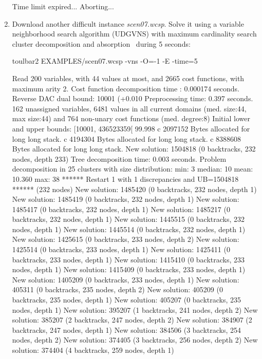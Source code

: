\begin{enumerate}
{\begin{DoxyCode}
Time limit expired... Aborting...
\end{DoxyCode}}
\item Download another difficult instance {\em scen07.wcsp}. Solve it using a variable neighborhood search algorithm (UDGVNS) with maximum cardinality search cluster decomposition and absorption~\cite{Ouali17} during 5 seconds:
\begin{DoxyCode}
	toulbar2 EXAMPLES/scen07.wcsp -vns -O=-1 -E -time=5
\end{DoxyCode}
{\scriptsize
\begin{DoxyCode}
Read 200 variables, with 44 values at most, and 2665 cost functions, with maximum arity 2.
Cost function decomposition time : 0.000174 seconds.
Reverse DAC dual bound: 10001 (+0.010%
Preprocessing time: 0.397 seconds.
162 unassigned variables, 6481 values in all current domains (med. size:44, max size:44) and 764 non-unary cost functions (med. degree:8)
Initial lower and upper bounds: [10001, 436523359[ 99.998%
c 2097152 Bytes allocated for long long stack.
c 4194304 Bytes allocated for long long stack.
c 8388608 Bytes allocated for long long stack.
New solution: 1504818 (0 backtracks, 232 nodes, depth 233)
Tree decomposition time: 0.003 seconds.
Problem decomposition in 25 clusters with size distribution: min: 3 median: 10 mean: 10.360 max: 38
****** Restart 1 with 1 discrepancies and UB=1504818 ****** (232 nodes)
New solution: 1485420 (0 backtracks, 232 nodes, depth 1)
New solution: 1485419 (0 backtracks, 232 nodes, depth 1)
New solution: 1485417 (0 backtracks, 232 nodes, depth 1)
New solution: 1485217 (0 backtracks, 232 nodes, depth 1)
New solution: 1445515 (0 backtracks, 232 nodes, depth 1)
New solution: 1445514 (0 backtracks, 232 nodes, depth 1)
New solution: 1425615 (0 backtracks, 233 nodes, depth 2)
New solution: 1425514 (0 backtracks, 233 nodes, depth 1)
New solution: 1425411 (0 backtracks, 233 nodes, depth 1)
New solution: 1415410 (0 backtracks, 233 nodes, depth 1)
New solution: 1415409 (0 backtracks, 233 nodes, depth 1)
New solution: 1405209 (0 backtracks, 233 nodes, depth 1)
New solution: 405311 (0 backtracks, 235 nodes, depth 2)
New solution: 405209 (0 backtracks, 235 nodes, depth 1)
New solution: 405207 (0 backtracks, 235 nodes, depth 1)
New solution: 395207 (1 backtracks, 241 nodes, depth 2)
New solution: 385207 (2 backtracks, 247 nodes, depth 2)
New solution: 384907 (2 backtracks, 247 nodes, depth 1)
New solution: 384506 (3 backtracks, 254 nodes, depth 2)
New solution: 374405 (3 backtracks, 256 nodes, depth 2)
New solution: 374404 (4 backtracks, 259 nodes, depth 1)

\end{DoxyCode}}
\end{enumerate}
